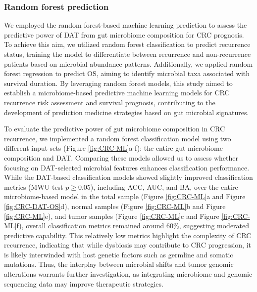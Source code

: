 \documentclass[11pt, a4paper, onecolumn, oneside]{report}
\begin{document}
            \subsubsection{Random forest prediction}
                We employed the random forest-based machine learning prediction to assess the predictive power of DAT from gut microbiome composition for CRC prognosis. To achieve this aim, we utilized random forest classification to predict recurrence status, training the model to differentiate between recurrence and non-recurrence patients based on microbial abundance patterns. Additionally, we applied random forest regression to predict OS, aiming to identify microbial taxa associated with survival duration. By leveraging random forest models, this study aimed to establish a microbiome-based predictive machine learning models for CRC recurrence risk assessment and survival prognosis, contributing to the development of prediction medicine strategies based on gut microbial signatures.

                To evaluate the predictive power of gut microbiome composition in CRC recurrence, we implemented a random forest classification model using two different input sets (Figure \ref{fig:CRC-ML}a-f): the entire gut microbiome composition and DAT. Comparing these models allowed us to assess whether focusing on DAT-selected microbial features enhances classification performance. While the DAT-based classification models showed slightly improved classification metrics (MWU test $p \ge 0.05$), including ACC, AUC, and BA, over the entire microbiome-based model in the total sample (Figure \ref{fig:CRC-ML}a and Figure \ref{fig:CRC-DAT-OS}d), normal samples (Figure \ref{fig:CRC-ML}b and Figure \ref{fig:CRC-ML}e), and tumor samples (Figure \ref{fig:CRC-ML}c and Figure \ref{fig:CRC-ML}f), overall classification metrics remained around 60\%, suggesting moderated predictive capability. This relatively low metrics highlight the complexity of CRC recurrence, indicating that while dysbiosis may contribute to CRC progression, it is likely interwinded with host genetic factors such as germline and somatic mutations. Thus, the interplay between microbial shifts and tumor genomic alterations warrants further investigation, as integrating microbiome and genomic sequencing data may improve therapeutic strategies.
\end{document}
